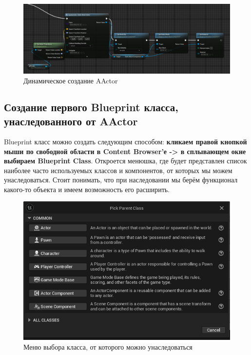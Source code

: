 \begin{figure}[h]
    \centering
    \includegraphics[width=\textwidth]{Lections/Lection_2/SpawnActor.png}
    \caption{Динамическое создание AActor}
\end{figure}

\subsection{Создание первого Blueprint класса, унаследованного от AActor}

Blueprint класс можно создать следующим способом: \textbf{кликаем правой кнопкой 
мыши по свободной области в Content Browser'е -> в сплывающем окне выбираем 
Blueprint Class}. Откроется менюшка, где будет представлен список наиболее
часто используемых классов и компонентов, от которых мы можем унаследоваться.
Стоит понимать, что при наследовании мы берём функционал какого-то объекта и имеем
возможность его расширить. 

\begin{figure}[h]
    \centering
    \includegraphics[width=\textwidth]{Lections/Lection_2/CreateBPActor.png}
    \caption{Меню выбора класса, от которого можно унаследоваться}
\end{figure}

